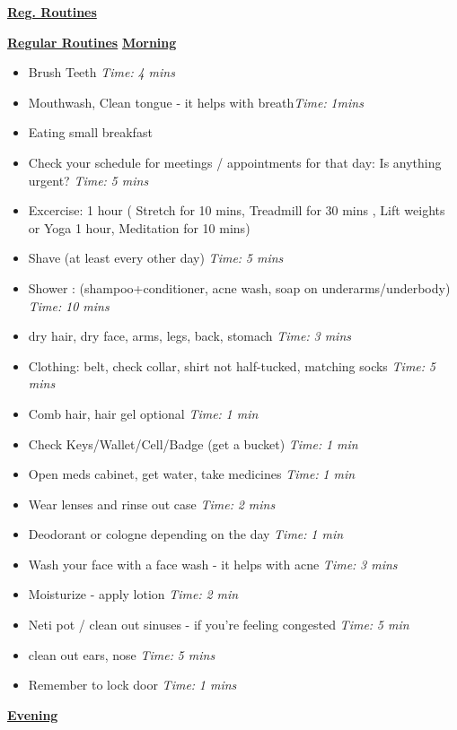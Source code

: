 \documentclass[serif,mathserif,final]{beamer}
\newcommand{\timeEst}[1]{\textit{Time:} \textit{#1}}
\begin{document}
\begin{frame}{}
\begin{columns}[t]
\begin{column}{0.27\linewidth} {\textbf{\underline{Reg. Routines}}}
\begin{block}{\small \textbf{\underline{Regular Routines}} }
\underline{\textbf{Morning}}
\begin{itemize}
\item \tiny Brush Teeth \timeEst{4 mins}
\item \tiny Mouthwash, Clean tongue - it helps with breath\timeEst{1mins} 
\item \tiny Eating small breakfast
\item \tiny Check your schedule for meetings / appointments for that day: Is anything urgent? \timeEst{5 mins}
\item \tiny Excercise: 1 hour ( Stretch for 10 mins, Treadmill for 30 mins , Lift weights or Yoga 1 hour, Meditation for 10 mins)
\item \tiny Shave (at least every other day) \timeEst{5 mins}
\item \tiny Shower : (shampoo+conditioner, acne wash,  soap on underarms/underbody)
\timeEst{10 mins}
\item \tiny dry hair, dry face, arms, legs, back, stomach \timeEst{3 mins}
\item \tiny Clothing: belt, check collar, shirt not half-tucked, matching socks \timeEst{5 mins}
\item \tiny Comb hair, hair gel optional \timeEst{ 1 min}
\item \tiny Check Keys/Wallet/Cell/Badge (get a bucket) \timeEst{1 min}
\item \tiny Open meds cabinet, get water, take medicines \timeEst{1 min}
\item \tiny Wear lenses and rinse out case \timeEst{ 2 mins}
\item \tiny Deodorant or cologne depending on the day \timeEst{1 min}
\item \tiny Wash your face with a face wash - it helps with acne \timeEst{3 mins}
\item \tiny Moisturize - apply lotion \timeEst{ 2 min}
\item \tiny Neti pot / clean out sinuses - if you’re feeling congested \timeEst{5 min}
\item \tiny clean out ears, nose \timeEst{5 mins}
\item \tiny Remember to lock door \timeEst{1 mins}
\end{itemize}

\underline{\textbf{Evening}}


\end{block}
\end{column}
\end{columns}
\end{frame}
\end{document}
